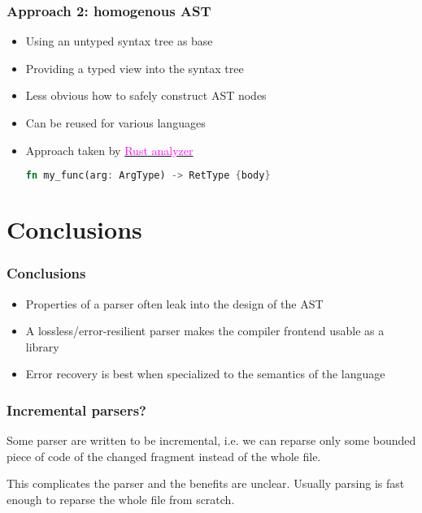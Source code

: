 \documentclass[compress,12pt,xcolor={dvipsnames}]{beamer}
\let\oldhref\href
\renewcommand{\href}[2]{\oldhref{#1}{\textcolor{magenta}{#2}}}
\begin{document}
\begin{frame}[fragile]
	\frametitle{Approach 2: homogenous AST}
	\begin{itemize}
		\item Using an untyped syntax tree as base
		\item Providing a typed view into the syntax tree
		\item Less obvious how to safely construct AST nodes
		\item Can be reused for various languages
		\item Approach taken by \href{https://github.com/rust-lang/rust-analyzer/blob/5bf2f85c8054d80424899fa581db1b192230efb5/crates/syntax/src/ast/generated/nodes.rs#L357}{Rust analyzer}
		      \begin{lstlisting}[language=Rust, gobble=18, numbers=off]
                  fn my_func(arg: ArgType) -> RetType {body}
              \end{lstlisting}
	\end{itemize}
\end{frame}


%



\section{Conclusions}

\begin{frame}
	\frametitle{Conclusions}
	\begin{itemize}
		\item Properties of a parser often leak into the design of the AST
		\item A lossless/error-resilient parser makes the compiler frontend usable as a library
		\item Error recovery is best when specialized to the semantics of the language
	\end{itemize}
\end{frame}

\End
\begin{frame}
	\frametitle{Incremental parsers?}

	Some parser are written to be incremental, i.e. we can reparse only some bounded piece of code of the changed fragment instead of the whole file.

	This complicates the parser and the benefits are unclear. Usually parsing is fast enough to reparse the whole file from scratch.
\end{frame}
\end{document}
